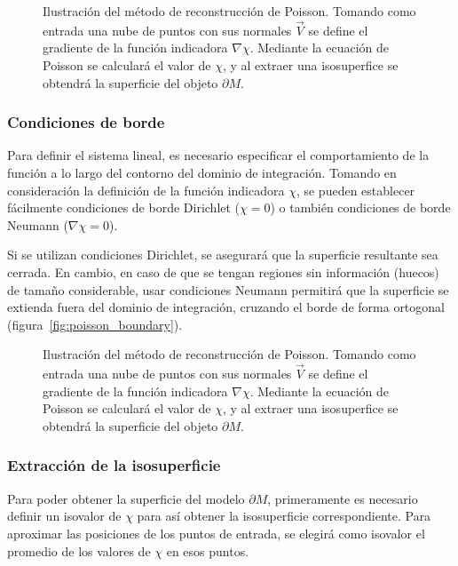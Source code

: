 	\begin{figure}
		\caption{\label{fig:poiss_planteo}Ilustración del método de reconstrucción de Poisson.
		Tomando como entrada una nube de puntos con sus normales $\vec{V}$ se define el gradiente de la función
		indicadora $\nabla \chi$. Mediante la ecuación de Poisson se calculará el valor de $\chi$,
		y al extraer una isosuperfice se obtendrá la superficie del objeto $\partial M$. 
		}
	\end{figure}

		\subsubsection{Condiciones de borde}
		Para definir el sistema lineal, es necesario especificar el
		comportamiento de la función a lo largo del contorno del dominio de
		integración.
		Tomando en consideración la definición de la función indicadora $\chi$,
		se pueden establecer fácilmente condiciones de borde Dirichlet ($\chi = 0$)
		o también condiciones de borde Neumann ($\nabla \chi = 0$).

		Si se utilizan condiciones Dirichlet, se asegurará que la superficie resultante sea cerrada.
		En cambio, en caso de que se tengan regiones sin información (huecos) de tamaño
		considerable, usar condiciones Neumann permitirá que la superficie se
		extienda fuera del dominio de integración, cruzando el borde de forma
		ortogonal (figura~\ref{fig:poisson_boundary})\cite{Kazhdan_screenedpoisson}.
		\begin{figure}
			\caption{\label{fig:poiss_planteo}Ilustración del método de reconstrucción de Poisson.
			Tomando como entrada una nube de puntos con sus normales $\vec{V}$ se define el gradiente de la función
			indicadora $\nabla \chi$. Mediante la ecuación de Poisson se calculará el valor de $\chi$,
			y al extraer una isosuperfice se obtendrá la superficie del objeto $\partial M$. 
			}
		\end{figure}


		\subsubsection{Extracción de la isosuperficie}
		Para poder obtener la superficie del modelo $\partial M$, primeramente es necesario
		definir un isovalor de $\chi$ para así obtener la isosuperficie correspondiente.
		Para aproximar las posiciones de los puntos de entrada, se elegirá como isovalor
		el promedio de los valores de $\chi$ en esos puntos.


